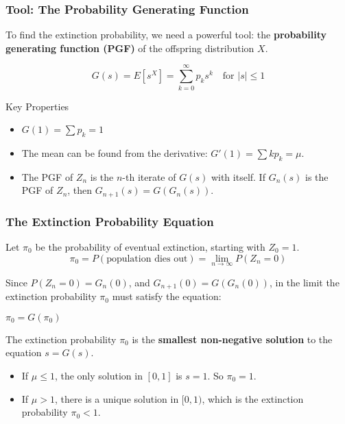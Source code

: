 \documentclass[aspectratio=169]{beamer}\usepackage[]{graphicx}\usepackage[]{xcolor}
\begin{document}
\begin{frame}
    \frametitle{Tool: The Probability Generating Function}

    To find the extinction probability, we need a powerful tool: the \textbf{probability generating function (PGF)} of the offspring distribution $X$.

    $$ G(s) = E[s^X] = \sum_{k=0}^{\infty} p_k s^k \quad \text{for } |s| \le 1 $$

    \begin{block}{Key Properties}
    \begin{itemize}
        \item $G(1) = \sum p_k = 1$
        \item The mean can be found from the derivative: $G'(1) = \sum k p_k = \mu$.
        \item The PGF of $Z_n$ is the $n$-th iterate of $G(s)$ with itself. If $G_n(s)$ is the PGF of $Z_n$, then $G_{n+1}(s) = G(G_n(s))$.
    \end{itemize}
    \end{block}

\end{frame}

\begin{frame}
    \frametitle{The Extinction Probability Equation}
    Let $\pi_0$ be the probability of eventual extinction, starting with $Z_0=1$.
    $$ \pi_0 = P(\text{population dies out}) = \lim_{n \to \infty} P(Z_n = 0) $$

    Since $P(Z_n=0) = G_n(0)$, and $G_{n+1}(0) = G(G_n(0))$, in the limit the extinction probability $\pi_0$ must satisfy the equation:

    \begin{center}
        \Huge
        $ \pi_0 = G(\pi_0) $
    \end{center}



    \begin{theorem}
    The extinction probability $\pi_0$ is the \textbf{smallest non-negative solution} to the equation $s = G(s)$.
    \end{theorem}

    \begin{itemize}
        \item If $\mu \le 1$, the only solution in $[0,1]$ is $s=1$. So $\pi_0=1$.
        \item If $\mu > 1$, there is a unique solution in $[0,1)$, which is the extinction probability $\pi_0 < 1$.
    \end{itemize}
\end{frame}
\end{document}
